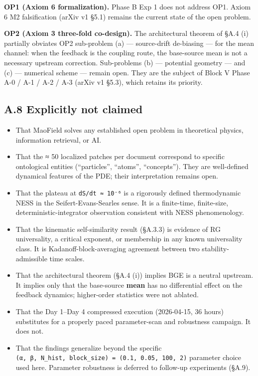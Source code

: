 \documentclass[
]{article}
\providecommand{\tightlist}{%
  \setlength{\itemsep}{0pt}\setlength{\parskip}{0pt}}
\begin{document}
\textbf{OP1 (Axiom 6 formalization).} Phase B Exp 1 does not address
OP1. Axiom 6 M2 falsification (arXiv v1 §5.1) remains the current state
of the open problem.

\textbf{OP2 (Axiom 3 three-fold co-design).} The architectural theorem
of §A.4 (i) partially obviates OP2 sub-problem (a) --- source-drift
de-biasing --- for the mean channel: when the feedback is the coupling
route, the base-source mean is not a necessary upstream correction.
Sub-problems (b) --- potential geometry --- and (c) --- numerical scheme
--- remain open. They are the subject of Block V Phase A-0 / A-1 / A-2 /
A-3 (arXiv v1 §5.3), which retains its priority.

\hypertarget{a.8-explicitly-not-claimed}{%
\subsection{A.8 Explicitly not
claimed}\label{a.8-explicitly-not-claimed}}

\begin{itemize}
\tightlist
\item
  That MaoField solves any established open problem in theoretical
  physics, information retrieval, or AI.
\item
  That the ≈ 50 localized patches per document correspond to specific
  ontological entities (``particles'', ``atoms'', ``concepts''). They
  are well-defined dynamical features of the PDE; their interpretation
  remains open.
\item
  That the plateau at \texttt{dS/dt\ ≈\ 10⁻⁶} is a rigorously defined
  thermodynamic NESS in the Seifert-Evans-Searles sense. It is a
  finite-time, finite-size, deterministic-integrator observation
  consistent with NESS phenomenology.
\item
  That the kinematic self-similarity result (§A.3.3) is evidence of RG
  universality, a critical exponent, or membership in any known
  universality class. It is Kadanoff-block-averaging agreement between
  two stability-admissible time scales.
\item
  That the architectural theorem (§A.4 (i)) implies BGE is a neutral
  upstream. It implies only that the base-source \textbf{mean} has no
  differential effect on the feedback dynamics; higher-order statistics
  were not ablated.
\item
  That the Day 1--Day 4 compressed execution (2026-04-15, 36 hours)
  substitutes for a properly paced parameter-scan and robustness
  campaign. It does not.
\item
  That the findings generalize beyond the specific
  \texttt{(α,\ β,\ N\_hist,\ block\_size)\ =\ (0.1,\ 0.05,\ 100,\ 2)}
  parameter choice used here. Parameter robustness is deferred to
  follow-up experiments (§A.9).
\end{itemize}
\end{document}
